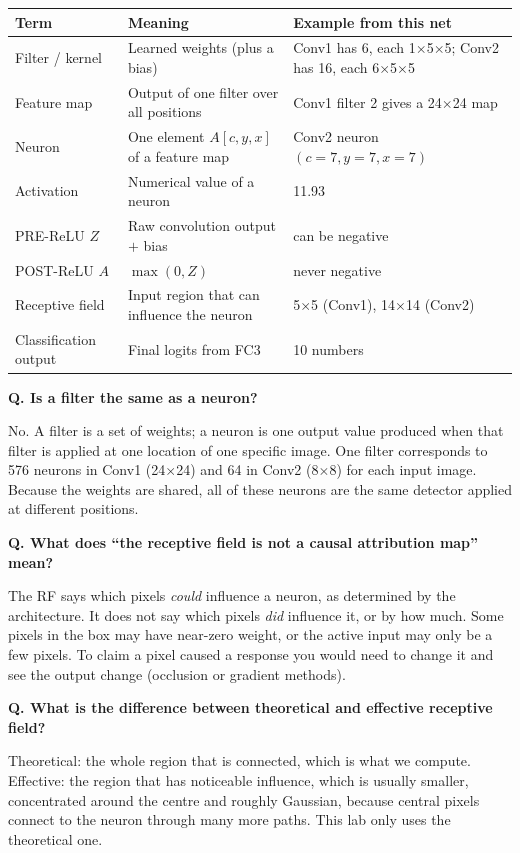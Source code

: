 \documentclass[11pt]{article}
\newcommand{\Q}[1]{\par\vspace{4pt}\noindent\textcolor{qcol}{\textbf{Q. #1}}\par\nopagebreak}
\newcommand{\A}[1]{\noindent #1\par}
\begin{document}
\begin{table}[h]
\centering
\begin{tabular}{p{3.2cm}p{5.2cm}p{6.5cm}}
\toprule
Term & Meaning & Example from this net \\
\midrule
Filter / kernel & Learned weights (plus a bias) & Conv1 has 6, each 1$\times$5$\times$5; Conv2 has 16, each 6$\times$5$\times$5 \\
Feature map & Output of one filter over all positions & Conv1 filter 2 gives a 24$\times$24 map \\
Neuron & One element $A[c,y,x]$ of a feature map & Conv2 neuron $(c{=}7,y{=}7,x{=}7)$ \\
Activation & Numerical value of a neuron & 11.93 \\
PRE-ReLU $Z$ & Raw convolution output $+$ bias & can be negative \\
POST-ReLU $A$ & $\max(0,Z)$ & never negative \\
Receptive field & Input region that can influence the neuron & 5$\times$5 (Conv1), 14$\times$14 (Conv2) \\
Classification output & Final logits from FC3 & 10 numbers \\
\bottomrule
\end{tabular}
\end{table}

\Q{Is a filter the same as a neuron?}
\A{No. A filter is a set of weights; a neuron is one output value produced when that filter is applied at one location of one specific image. One filter corresponds to 576 neurons in Conv1 (24$\times$24) and 64 in Conv2 (8$\times$8) for each input image. Because the weights are shared, all of these neurons are the same detector applied at different positions.}

\Q{What does ``the receptive field is not a causal attribution map'' mean?}
\A{The RF says which pixels \emph{could} influence a neuron, as determined by the architecture. It does not say which pixels \emph{did} influence it, or by how much. Some pixels in the box may have near-zero weight, or the active input may only be a few pixels. To claim a pixel caused a response you would need to change it and see the output change (occlusion or gradient methods).}

\Q{What is the difference between theoretical and effective receptive field?}
\A{Theoretical: the whole region that is connected, which is what we compute. Effective: the region that has noticeable influence, which is usually smaller, concentrated around the centre and roughly Gaussian, because central pixels connect to the neuron through many more paths. This lab only uses the theoretical one.}
\end{document}
